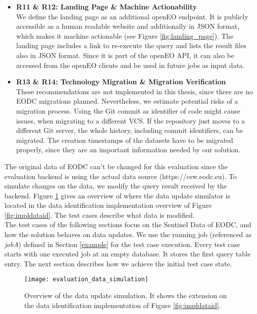 \documentclass[draft,final]{vutinfth} %
\newcommand{\bgoesswein}[1]{{\color{blue}#1}}
\begin{document}
\begin{itemize}
	\item \textbf{R11 \& R12: Landing Page \& Machine Actionability} \\
	We define the landing page as an additional openEO endpoint. It is publicly accessible \bgoesswein{as a human readable website and additionally} in JSON format, which makes it machine actionable \bgoesswein{(see Figure \ref{fig:landing_page})}. The landing page includes a link to re-execute the query and lists the result files also in JSON format. Since it is part of the openEO API, it can also be accessed from the openEO clients and be used in future jobs as input data.
	\item \textbf{R13 \& R14: Technology Migration \& Migration Verification} \\
	These recommendations are not implemented in this thesis, since there are no EODC migrations planned. \bgoesswein{Nevertheless, we estimate potential risks of a migration process. Using the Git commit as identifier of code might cause issues, when migrating to a different VCS. If the repository just moves to a different Git server, the whole history, including commit identifiers, can be migrated. The creation timestamps of the datasets have to be migrated properly, since they are an important information needed by our solution.}
\end{itemize}

The original data of EODC can't be changed for this evaluation since the evaluation backend is using the actual data source (https://csw.eodc.eu). To simulate changes on the data, we modify the query result received by the backend. Figure \ref{fig:eva_data_simulation} gives an overview of where the data update simulator is located in the data identification implementation overview of Figure \ref{fig:impldataid}. The test cases describe what data is modified. \\
The test cases of the following sections focus on the Sentinel Data of EODC, and how the solution behaves on data updates. We use the running job (referenced as \textit{jobA}) defined in Section \ref{example} for the test case execution. Every test case starts with one executed job at an empty database. It stores the first query table entry. The next section describes how we achieve the initial test case state.

\begin{figure}[h]
	\centering
	\texttt{[image: evaluation\_data\_simulation]}
	\caption{Overview of the data update simulation. It shows the extension on the data identification implementation of Figure \ref{fig:impldataid}.}
	\label{fig:eva_data_simulation} %
\end{figure}
\end{document}
